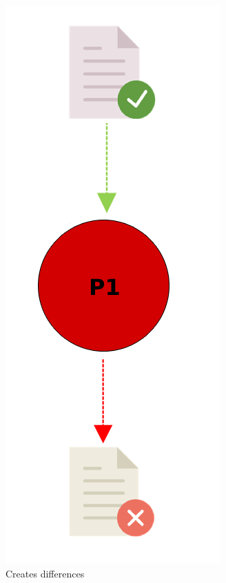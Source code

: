 \documentclass[a4paper,num-refs]{oup-contemporary}
\begin{document}
\begin{figure}
\begin{subfigure}{0.35\linewidth}
    \includegraphics[scale=0.36]{images/red.png}
    \caption{Creates differences}
    \label{fig:red}
    \end{subfigure}
    \hfill
    \begin{subfigure}{0.3\linewidth}
      \centering

\end{subfigure}
\end{figure}
\end{document}
